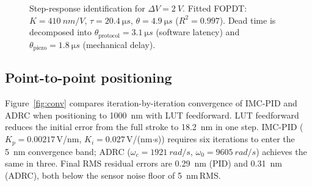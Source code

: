 \documentclass[fleqn,10pt]{wlscirep}
\begin{document}
\begin{figure}[ht]
    \centering
    \caption{Step-response identification for $\Delta V = \SI{2}{V}$. Fitted FOPDT: $K = \SI{410}{nm/V}$, $\tau = \SI{20.4}{\micro s}$, $\theta = \SI{4.9}{\micro s}$ ($R^2 = 0.997$). Dead time is decomposed into $\theta_{\text{protocol}} = \SI{3.1}{\micro s}$ (software latency) and $\theta_{\text{piezo}} = \SI{1.8}{\micro s}$ (mechanical delay).}
    \label{fig:stepid}
\end{figure}

\subsection*{Point-to-point positioning}

Figure~\ref{fig:conv} compares iteration-by-iteration convergence of IMC-PID and ADRC when positioning to \SI{1000}{nm} with LUT feedforward. LUT feedforward reduces the initial error from the full stroke to \SI{18.2}{nm} in one step. IMC-PID ($K_p = 0.00217$\,V/nm, $K_i = 0.027$\,V/(nm$\cdot$s)) requires six iterations to enter the \SI{5}{nm} convergence band; ADRC ($\omega_c = \SI{1921}{rad/s}$, $\omega_0 = \SI{9605}{rad/s}$) achieves the same in three. Final RMS residual errors are \SI{0.29}{nm} (PID) and \SI{0.31}{nm} (ADRC), both below the sensor noise floor of \SI{5}{nm}\,RMS.
\end{document}
